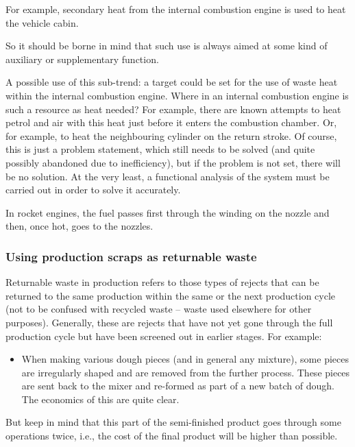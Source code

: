 \documentclass[a4paper,11pt]{article}
\begin{document}
For example, secondary heat from the internal combustion engine is used to
heat the vehicle cabin.

So it should be borne in mind that such use is always aimed at some kind of
auxiliary or supplementary function.

A possible use of this sub-trend: a target could be set for the use of waste
heat within the internal combustion engine. Where in an internal combustion
engine is such a resource as heat needed? For example, there are known
attempts to heat petrol and air with this heat just before it enters the
combustion chamber. Or, for example, to heat the neighbouring cylinder on the
return stroke. Of course, this is just a problem statement, which still needs
to be solved (and quite possibly abandoned due to inefficiency), but if the
problem is not set, there will be no solution. At the very least, a functional
analysis of the system must be carried out in order to solve it accurately.

In rocket engines, the fuel passes first through the winding on the nozzle and
then, once hot, goes to the nozzles.

\subsubsection*{Using production scraps as returnable waste}

Returnable waste in production refers to those types of rejects that can be
returned to the same production within the same or the next production cycle
(not to be confused with recycled waste -- waste used elsewhere for other
purposes). Generally, these are rejects that have not yet gone through the
full production cycle but have been screened out in earlier stages. For
example:
\begin{itemize}
\item When making various dough pieces (and in general any mixture), some
  pieces are irregularly shaped and are removed from the further process.
  These pieces are sent back to the mixer and re-formed as part of a new batch
  of dough. The economics of this are quite clear.
\end{itemize}
But keep in mind that this part of the semi-finished product goes through some
operations twice, i.e., the cost of the final product will be higher than
possible.
\end{document}

